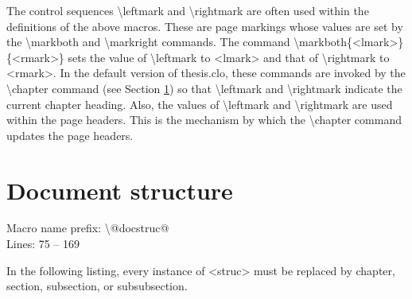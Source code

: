 \documentclass[twoside,openany]{thesis}
\begin{document}
The control sequences {\ttfamily\textbackslash leftmark} and {\ttfamily\textbackslash rightmark} are often used within the definitions of the above macros.
These are page markings whose values are set by the {\ttfamily\textbackslash markboth} and {\ttfamily\textbackslash markright} commands.
The command {\ttfamily\textbackslash markboth\{<lmark>\}\{<rmark>\}} sets the value of {\ttfamily\textbackslash leftmark} to {\ttfamily<lmark>} and that of {\ttfamily\textbackslash rightmark} to {\ttfamily<rmark>}.
In the default version of {\ttfamily thesis.clo}, these commands are invoked by the {\ttfamily\textbackslash chapter} command (see Section \ref{sec:Document structure}) so that {\ttfamily\textbackslash leftmark} and {\ttfamily\textbackslash rightmark} indicate the current chapter heading.
Also, the values of {\ttfamily\textbackslash leftmark} and {\ttfamily\textbackslash rightmark} are used within the page headers.
This is the mechanism by which the {\ttfamily\textbackslash chapter} command updates the page headers.

\section{Document structure}\label{sec:Document structure}

Macro name prefix: {\ttfamily\textbackslash @docstruc@}\\
Lines: 75 -- 169

In the following listing, every instance of {\ttfamily<struc>} must be replaced by {\ttfamily chapter}, {\ttfamily section}, {\ttfamily subsection}, or {\ttfamily subsubsection}.
\end{document}
